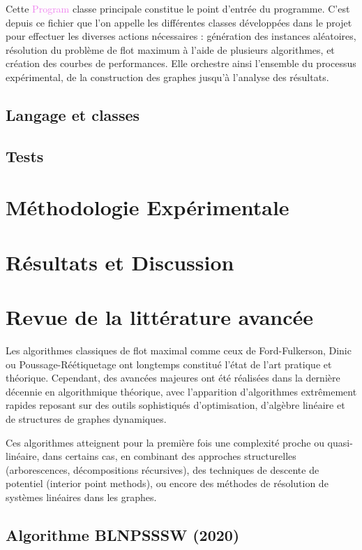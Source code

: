 \documentclass[a4paper]{article}
\begin{document}
Cette \textcolor{violet}{Program} classe principale constitue le point d'entrée du programme. C’est depuis ce fichier que l’on appelle les différentes classes développées dans le projet pour effectuer les diverses actions nécessaires : génération des instances aléatoires, résolution du problème de flot maximum à l’aide de plusieurs algorithmes, et création des courbes de performances. Elle orchestre ainsi l’ensemble du processus expérimental, de la construction des graphes jusqu’à l’analyse des résultats.

\subsection{Langage et classes}

\subsection{Tests}
\section{Méthodologie Expérimentale}
\section{Résultats et Discussion}
\section{Revue de la littérature avancée}

Les algorithmes classiques de flot maximal comme ceux de Ford-Fulkerson, Dinic ou Poussage-Réétiquetage ont longtemps constitué l’état de l’art pratique et théorique. Cependant, des avancées majeures ont été réalisées dans la dernière décennie en algorithmique théorique, avec l’apparition d’algorithmes extrêmement rapides reposant sur des outils sophistiqués d’optimisation, d’algèbre linéaire et de structures de graphes dynamiques.

Ces algorithmes atteignent pour la première fois une complexité proche ou quasi-linéaire, dans certains cas, en combinant des approches structurelles (arborescences, décompositions récursives), des techniques de descente de potentiel (interior point methods), ou encore des méthodes de résolution de systèmes linéaires dans les graphes.

\subsection{Algorithme BLNPSSSW (2020)}
\end{document}
